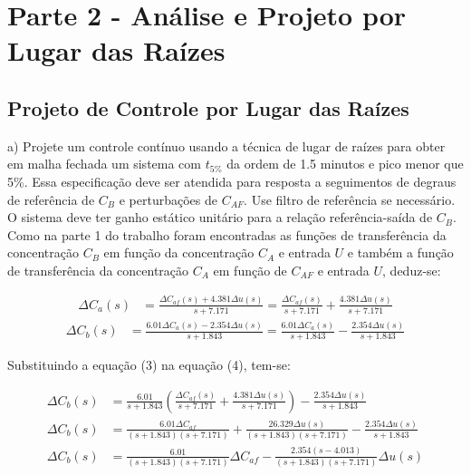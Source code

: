 \documentclass[a4paper,12pt]{article}
\begin{document}
\newpage

\section{Parte 2 -  Análise e Projeto por Lugar das Raízes}
\subsection{Projeto de Controle por Lugar das Raízes}

a) Projete um controle contínuo usando a técnica de lugar de raízes para obter em malha fechada um sistema com \(t_{5\%}\) da ordem de 1.5 minutos e pico menor que 5\%. Essa especificação deve ser atendida para resposta a seguimentos de degraus de referência de \(C_B\) e perturbações de \(C_{AF}\). Use filtro de referência se necessário. O sistema deve ter ganho estático unitário para a relação referência-saída de \(C_B\).\\


Como na parte 1 do trabalho foram encontradas as funções de transferência da concentração \(C_B\) em função da concentração \(C_A\) e entrada \(U\) e também a função de transferência da concentração \(C_A\) em função de \(C_{AF}\) e entrada \(U\), deduz-se:

\begin{align}
\Delta C_a(s) &= \frac{\Delta C_{af}(s) + 4.381 \Delta u(s)}{s + 7.171} = \frac{\Delta C_{af}(s)}{s + 7.171} + \frac{4.381 \Delta u(s)}{s + 7.171}
\end{align}
\begin{align}
\Delta C_b(s) &= \frac{6.01 \Delta C_a(s) - 2.354 \Delta u(s)}{s + 1.843} = \frac{6.01 \Delta C_a(s)}{s + 1.843} - \frac{2.354 \Delta u(s)}{s + 1.843}
\end{align}

Substituindo a equação (3) na equação (4), tem-se:

\begin{align}
\Delta C_b(s) &= \frac{6.01}{s + 1.843}\left(\frac{\Delta C_{af}(s)}{s + 7.171} + \frac{4.381 \Delta u(s)}{s + 7.171}\right) - \frac{2.354 \Delta u(s)}{s + 1.843}\\
\Delta C_b(s) &= \frac{6.01\Delta C_{af}}{(s + 1.843)(s + 7.171)} + \frac{26.329\Delta u(s)}{(s + 1.843)(s + 7.171)} - \frac{2.354 \Delta u(s)}{s + 1.843}\\
\Delta C_b(s) &= \frac{6.01}{(s + 1.843)(s + 7.171)}\Delta C_{af} - \frac{2.354(s-4.013)}{(s + 1.843)(s + 7.171)}\Delta u(s)\\
\end{align}
\end{document}
